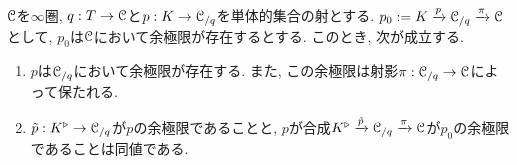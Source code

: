 \documentclass[uplatex, a4paper, 14Q, dvipdfmx]{jsreport}
\begin{document}
\begin{proposition} \label{prop.1.2.13.8}
  $\mathcal{C}$を$\infty$圏, $q : T \to \mathcal{C}$と$p : K \to \mathcal{C}_{/q}$を単体的集合の射とする. 
  $p_0 := K \xrightarrow{p} \mathcal{C}_{/q} \xrightarrow{\pi} \mathcal{C}$として, $p_0$は$\mathcal{C}$において余極限が存在するとする. 
  このとき, 次が成立する. 
  \begin{enumerate}
    \item $p$は$\mathcal{C}_{/q}$において余極限が存在する.
    また, この余極限は射影$\pi : \mathcal{C}_{/q} \to \mathcal{C}$によって保たれる.  
    \item $\tilde{p} : K^\triangleright \to \mathcal{C}_{/q}$が$p$の余極限であることと, $p$が合成$K^\triangleright \xrightarrow{\tilde{p}} \mathcal{C}_{/q} \xrightarrow{\pi} \mathcal{C}$が$p_0$の余極限であることは同値である. 
  \end{enumerate}
\end{proposition}
\end{document}
